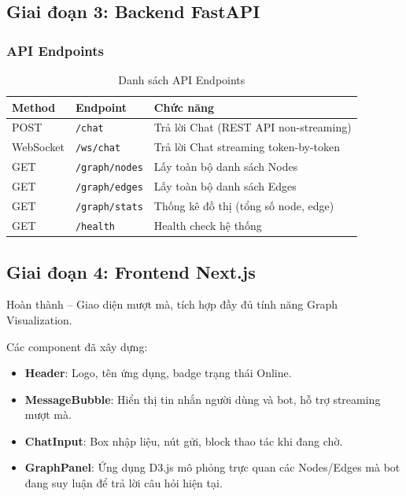 \documentclass[12pt,a4paper]{article}
\begin{document}
\subsection{Giai đoạn 3: Backend FastAPI}
\subsubsection{API Endpoints}
\begin{table}[H]
\centering
\caption{Danh sách API Endpoints}
\begin{tabular}{lll}
\toprule
\textbf{Method} & \textbf{Endpoint} & \textbf{Chức năng} \\
\midrule
POST & \texttt{/chat} & Trả lời Chat (REST API non-streaming) \\
WebSocket & \texttt{/ws/chat} & Trả lời Chat streaming token-by-token \\
GET & \texttt{/graph/nodes} & Lấy toàn bộ danh sách Nodes \\
GET & \texttt{/graph/edges} & Lấy toàn bộ danh sách Edges \\
GET & \texttt{/graph/stats} & Thống kê đồ thị (tổng số node, edge) \\
GET & \texttt{/health} & Health check hệ thống \\
\bottomrule
\end{tabular}
\end{table}

\subsection{Giai đoạn 4: Frontend Next.js}
\begin{tcolorbox}[colback=green!5, colframe=codegreen, title=\textbf{Trạng thái}]
Hoàn thành -- Giao diện mượt mà, tích hợp đầy đủ tính năng Graph Visualization.
\end{tcolorbox}
Các component đã xây dựng:
\begin{itemize}
\item \textbf{Header}: Logo, tên ứng dụng, badge trạng thái Online.
\item \textbf{MessageBubble}: Hiển thị tin nhắn người dùng và bot, hỗ trợ streaming mượt mà.
\item \textbf{ChatInput}: Box nhập liệu, nút gửi, block thao tác khi đang chờ.
\item \textbf{GraphPanel}: Ứng dụng D3.js mô phỏng trực quan các Nodes/Edges mà bot đang suy luận để trả lời câu hỏi hiện tại.
\end{itemize}
\end{document}
